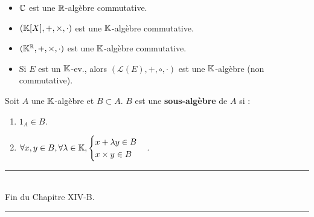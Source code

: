 \documentclass[12pt, a4paper]{report}
\begin{document}
\begin{example}
    \begin{itemize}
        \item $\mathbb{C}$ est une $\mathbb{R}$-algèbre commutative.
        \item $(\mathbb{K}[X],+,\times,\cdot)$ est une $\mathbb{K}$-algèbre commutative.
        \item $(\mathbb{K}^{\mathbb{R}}, +, \times, \cdot)$ est une $\mathbb{K}$-algèbre commutative.
        \item Si $E$ est un $\mathbb{K}$-ev., alors $(\mathcal L(E), +, \circ, \cdot)$ est une $\mathbb{K}$-algèbre (non commutative).
    \end{itemize}
\end{example}


\begin{definition}
    Soit $A$ une $\mathbb{K}$-algèbre et $B \subset A$.
    $B$ est une \textbf{sous-algèbre} de $A$ si :
    \begin{enumerate}
        \item $1_A \in B$.
        \item $\forall x,y \in B, \forall \lambda \in \mathbb{K}, \begin{cases} x + \lambda y \in B\\ x \times y \in B\end{cases}$.
    \end{enumerate}
\end{definition}

\begin{center}
    \rule{0.5\textwidth}{1pt}\\
    Fin du Chapitre XIV-B.\\
    \rule{0.5\textwidth}{1pt}
\end{center}

\printindex
\end{document}
